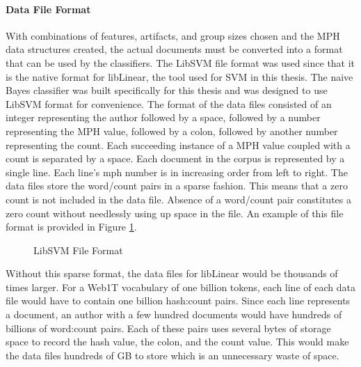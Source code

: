 		\paragraph{Data File Format}With combinations of features, artifacts, and group sizes chosen and the MPH data structures created, the actual documents must be converted into a format that can be used by the classifiers. The LibSVM file format was used since that it is the native format for libLinear, the tool used for SVM in this thesis. \cite{fan_liblinear:_2008}  The naive Bayes classifier was built specifically for this thesis and was designed to use LibSVM format for convenience. The format of the data files consisted of an integer representing the author followed by a space, followed by a number representing the MPH value, followed by a colon, followed by another number representing the count.  Each succeeding instance of a MPH value coupled with a count is separated by a space.  Each document in the corpus is represented by a single line.  Each line's mph number is in increasing order from left to right.  The data files store the word/count pairs in a sparse fashion.  This means that a zero count is not included in the data file.  Absence of a word/count pair constitutes a zero count without needlessly using up space in the file.  An example of this file format is provided in Figure \ref{fig:svmFormat}.
		\begin{figure}[ht!]
			\begin{center}
				\caption{LibSVM File Format}
				\label{fig:svmFormat}
			\end{center}
		\end{figure}
	
	Without this sparse format, the data files for libLinear would be thousands of times larger.  For a Web1T vocabulary of one billion tokens, each line of each data file would have to contain one billion hash:count pairs.  Since each line represents a document, an author with a few hundred documents would have hundreds of billions of word:count pairs.  Each of these pairs uses several bytes of storage space to record the hash value, the colon, and the count value.  This would make the data files hundreds of GB to store which is an unnecessary waste of space.
	
